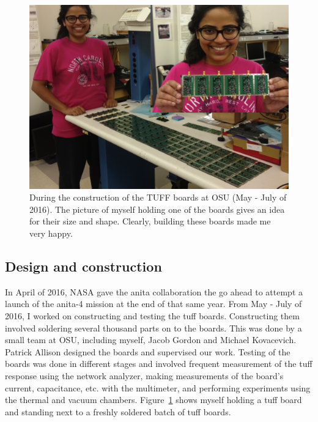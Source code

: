 \begin{figure}
\centering
\includegraphics[width=1.0\textwidth]{figures/tuff_construction.png}
\caption{During the construction of the TUFF boards at OSU (May - July of 2016). The picture of myself holding one of the boards gives an idea for their size and shape. Clearly, building these boards made me very happy.}
\label{tuff_construction}
\end{figure}

\subsection{Design and construction}

In April of 2016, NASA gave the \gls{anita} collaboration the go ahead to attempt a launch of the \gls{anita}-4 mission at the end of that same year. From May - July of 2016, I worked on constructing and testing the \gls{tuff} boards. Constructing them involved soldering several thousand parts on to the boards. This was done by a small team at OSU, including myself, Jacob Gordon and Michael Kovacevich. Patrick Allison designed the boards and supervised our work. Testing of the boards was done in different stages and involved frequent measurement of the \gls{tuff} response using the network analyzer, making measurements of the board's current, capacitance, etc. with the multimeter, and performing experiments using the thermal and vacuum chambers. Figure~\ref{tuff_construction} shows myself holding a \gls{tuff} board and standing next to a freshly soldered batch of \gls{tuff} boards.

